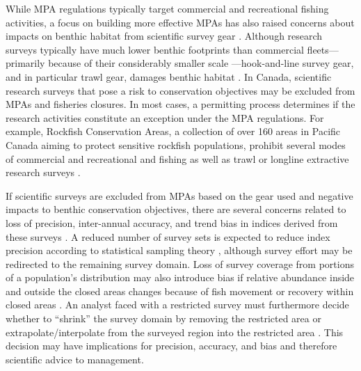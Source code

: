 \documentclass[12pt]{article}
\begin{document}
While MPA regulations typically target commercial and recreational fishing activities, a focus on building more effective MPAs has also raised concerns about impacts on benthic habitat from scientific survey gear \citep{field2006, ursgroup2016, saarman2018, benoit2020national}. Although research surveys typically have much lower benthic footprints than commercial fleets---primarily because of their considerably smaller scale \citep{benoit2020national}---hook-and-line survey gear, and in particular trawl gear, damages benthic habitat \citep[e.g.,][]{collie2000a, kaiser2006, hiddink2017}. In Canada, scientific research surveys that pose a risk to conservation objectives may be excluded from MPAs and fisheries closures. In most cases, a permitting process determines if the research activities constitute an exception under the MPA regulations. For example, Rockfish Conservation Areas, a collection of over 160 areas in Pacific Canada aiming to protect sensitive rockfish populations, prohibit several modes of commercial and recreational and fishing as well as trawl or longline extractive research surveys \citep{thornborough2020}.

If scientific surveys are excluded from MPAs based on the gear used and negative impacts to benthic conservation objectives, there are several concerns related to loss of precision, inter-annual accuracy, and trend bias in indices derived from these surveys \citep{field2006, rideout2017, saarman2018, benoit2020national, benoit2020gulf, ices2023}.
A reduced number of survey sets is expected to reduce index precision according to statistical sampling theory \citep{cochran1977}, although survey effort may be redirected to the remaining survey domain.
Loss of survey coverage from portions of a population's distribution may also introduce bias if relative abundance inside and outside the closed areas changes because of fish movement or recovery within closed areas \citep[][]{benoit2020national}.
An analyst faced with a restricted survey must furthermore decide whether to ``shrink'' the survey domain by removing the restricted area \citep{rideout2017, benoit2020national} or extrapolate/interpolate from the surveyed region into the restricted area \citep{benoit2020national}.
This decision may have implications for precision, accuracy, and bias and therefore scientific advice to management.
\end{document}
